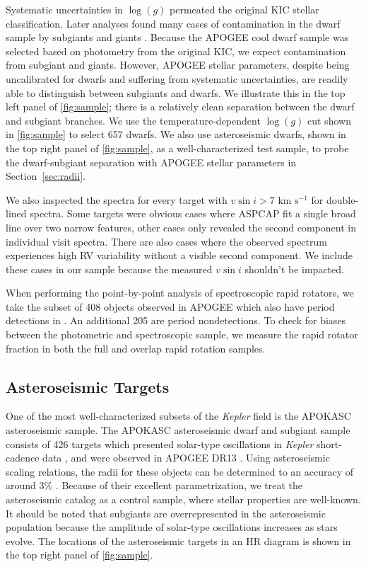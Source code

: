 \documentclass[manuscript]{aastex6}
\newcommand{\vsini}{\ensuremath{v \sin i}}
\newcommand{\Kepler}{\mbox{\textit{Kepler}}}
\newcommand{\logg}{\ensuremath{\log(g)}}
\newcommand{\kms}{\textrm{ km~s}\ensuremath{^{-1}}}
\begin{document}
Systematic uncertainties in \logg{} permeated the original KIC stellar
classification. Later analyses found many cases of contamination in the dwarf 
sample by subgiants 
and giants \citep{Mann12,Gaidos13}. Because the APOGEE cool dwarf sample was 
selected based on photometry from the original KIC, we expect contamination 
from subgiant and giants. However, APOGEE stellar parameters, 
despite being uncalibrated for dwarfs and suffering from 
systematic uncertainties, are readily able to distinguish between subgiants and 
dwarfs. We illustrate this in the top left panel of \cref{fig:sample}; there is a 
relatively clean separation between the dwarf and subgiant branches. We use the
temperature-dependent \logg{} cut shown in \cref{fig:sample} to select 657
dwarfs. We also use asteroseismic dwarfs, shown in the top right panel of
\cref{fig:sample}, as a well-characterized test sample, to probe the 
dwarf-subgiant separation with APOGEE stellar parameters in
Section~\ref{sec:radii}.

We also inspected the spectra for every target with \(\vsini > 7 \kms\)
for double-lined spectra. Some targets were obvious cases where ASPCAP fit a 
single broad line over two narrow features, other cases only revealed the
second component in individual visit spectra. There are
also cases where the observed spectrum experiences high RV variability
without a visible second component. We include these cases in our sample
because the measured \vsini{} shouldn't be impacted.

When performing the point-by-point analysis of spectroscopic rapid rotators, 
we take the subset of 408 objects
observed in APOGEE which also have period detections in \citet{McQuillan14}.
An additional 205 are period nondetections. To check for biases between the
photometric and spectroscopic sample, we measure the rapid rotator fraction in
both the full and overlap rapid rotation samples.

\subsection{Asteroseismic Targets}

One of the most well-characterized subsets of the \Kepler{} field is the
APOKASC asteroseismic sample. The APOKASC asteroseismic dwarf and subgiant 
sample consists of 426 targets which presented solar-type oscillations in 
\Kepler{} short-cadence data \citep{Chaplin11}, and were observed in APOGEE DR13
\citep{Majewski17}. Using asteroseismic scaling relations, the radii
for these objects can be determined to an accuracy of around 3\%
\citep{Serenelli17}. Because of their excellent parametrization, we treat the
asteroseismic catalog as a control sample, where stellar properties are
well-known. It should be noted that subgiants are overrepresented in
the asteroseismic population because the amplitude of solar-type oscillations 
increases as stars evolve. The locations of the asteroseismic targets in an HR
diagram is shown in the top right panel of \cref{fig:sample}.
\end{document}
